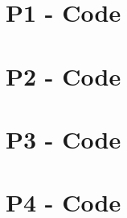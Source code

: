 \documentclass{tron}
\begin{document}
\newpage
\appendix
\begin{appendices}
\section{P1 - Code}


\section{P2 - Code}


\section{P3 - Code}


\section{P4 - Code}



\end{appendices}
\end{document}
